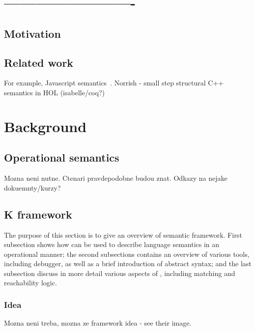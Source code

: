 \documentclass{fithesis3}
\begin{document}
\ifshowoldstuff

\chapter{-------------------------}

\section{Motivation}

\section{Related work}
For example, Javascript semantics~\cite{park-stefanescu-rosu-2015-pldi}.
Norrish - small step structural C++ semantics in HOL (isabelle/coq?)


\chapter{Background}

\section{Operational semantics}
Mozna neni nutne. Ctenari pravdepodobne budou znat. Odkazy na nejake dokuemnty/kurzy?


\section{K framework}

The purpose of this section is to give an overview of \K semantic framework. First subsection shows how \K can be used to describe language semantics in an operational manner; the second subsections contains an overview of various \K tools, including debugger, as well as a brief introduction of \K abstract syntax; and the last subsection discuss in more detail various aspects of \K, including matching and reachability logic.

\subsection{Idea}
Mozna neni treba, mozna ze 
\K framework idea - see their image.
\end{document}
